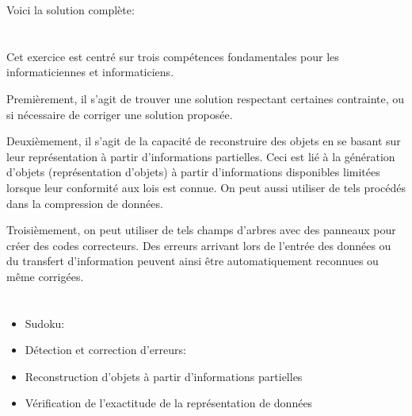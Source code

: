 {{Voici la solution complète:

{\centering%
\par}



\section*{\BrochureItsInformatics}
Cet exercice est centré sur trois compétences fondamentales pour les informaticiennes et informaticiens.

Premièrement, il s’agit de trouver une solution respectant certaines contrainte, ou si nécessaire de corriger une solution proposée.

Deuxièmement, il s’agit de la capacité de reconstruire des objets en se basant sur leur représentation à partir d’informations partielles. Ceci est lié à la génération d’objets (représentation d’objets) à partir d’informations disponibles limitées lorsque leur conformité aux lois est connue. On peut aussi utiliser de tels procédés dans la compression de données.

Troisièmement, on peut utiliser de tels champs d’arbres avec des panneaux pour créer des codes correcteurs. Des erreurs arrivant lors de l’entrée des données ou du transfert d’information peuvent ainsi être automatiquement reconnues ou même corrigées.



\section*{\BrochureWebsitesAndKeywords}
{\raggedright
\begin{itemize}
  \item Sudoku: \href{https://fr.wikipedia.org/wiki/Sudoku}{}
  \item Détection et correction d’erreurs: \href{https://fr.wikipedia.org/wiki/Code_correcteur}{}
  \item Reconstruction d’objets à partir d’informations partielles
  \item Vérification de l’exactitude de la représentation de données
\end{itemize}


}

}}
